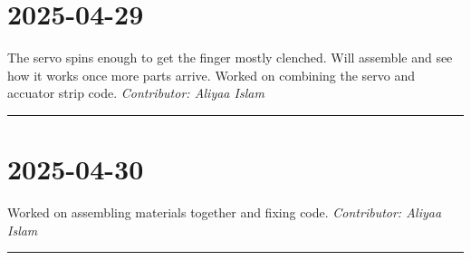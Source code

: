 \documentclass[12pt]{article}
\begin{document}
\section*{2025-04-29}
The servo spins enough to get the finger mostly clenched. Will assemble and see how it works once more parts arrive. 
Worked on combining the servo and accuator strip code.
\vspace{1em}
\noindent\textit{Contributor: Aliyaa Islam}
\vspace{1em}
\hrule

\section*{2025-04-30}
Worked on assembling materials together and fixing code. 
\vspace{1em}
\noindent\textit{Contributor: Aliyaa Islam}
\vspace{1em}
\hrule
\end{document}
